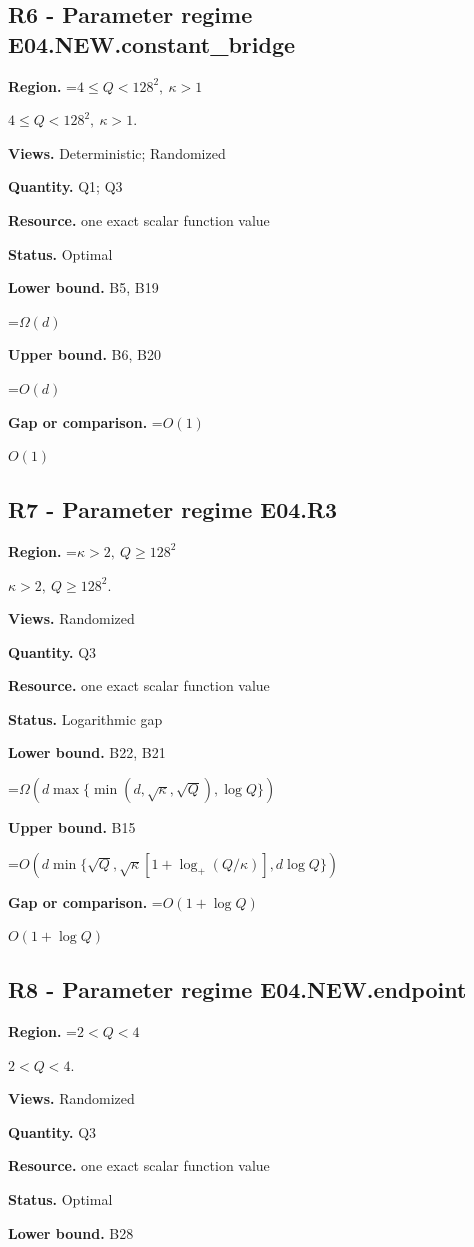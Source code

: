 \documentclass[10pt,a4paper]{article}
\newcommand{\AtlasMath}[1]{\par\begingroup\centering\setbox0=\hbox{$\displaystyle #1$}\ifdim\wd0>1.4\linewidth\typeout{ATLAS WIDE FORMULA: \the\wd0}\fi\ifdim\wd0>\linewidth\resizebox{\linewidth}{!}{\box0}\else\box0\fi\par\endgroup}
\newcommand{\AtlasInlineMath}[1]{\begingroup\setbox0=\hbox{$#1$}\ifdim\wd0>.4\linewidth\endgroup\AtlasMath{#1}\else\endgroup$#1$\fi}
\begin{document}
\subsection{R6 - Parameter regime E04.NEW.constant\_bridge}
\textbf{Region.} \AtlasInlineMath{4\le Q<128^2,\ \kappa>1}.

\textbf{Views.} Deterministic; Randomized

\textbf{Quantity.} Q1; Q3

\textbf{Resource.} one exact scalar function value

\textbf{Status.} Optimal

\textbf{Lower bound.} B5, B19

\AtlasMath{\Omega(d)}
\textbf{Upper bound.} B6, B20

\AtlasMath{O(d)}
\textbf{Gap or comparison.} \AtlasInlineMath{O(1)}

\subsection{R7 - Parameter regime E04.R3}
\textbf{Region.} \AtlasInlineMath{\kappa>2,\ Q\ge128^2}.

\textbf{Views.} Randomized

\textbf{Quantity.} Q3

\textbf{Resource.} one exact scalar function value

\textbf{Status.} Logarithmic gap

\textbf{Lower bound.} B22, B21

\AtlasMath{\Omega\!\left(d\max\{\min(d,\sqrt\kappa,\sqrt Q),\log Q\}\right)}
\textbf{Upper bound.} B15

\AtlasMath{O(d\min\{\sqrt Q,\sqrt\kappa[1+\log_+(Q/\kappa)],d\log Q\})}
\textbf{Gap or comparison.} \AtlasInlineMath{O(1+\log Q)}

\subsection{R8 - Parameter regime E04.NEW.endpoint}
\textbf{Region.} \AtlasInlineMath{2<Q<4}.

\textbf{Views.} Randomized

\textbf{Quantity.} Q3

\textbf{Resource.} one exact scalar function value

\textbf{Status.} Optimal

\textbf{Lower bound.} B28
\end{document}

